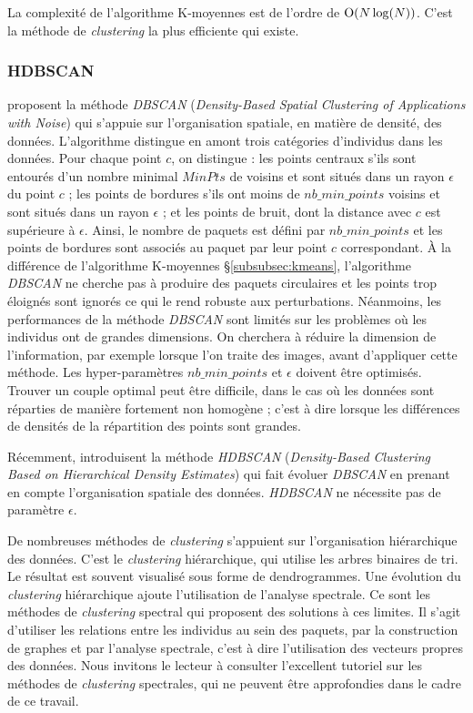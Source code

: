La complexité de l'algorithme K-moyennes est de l'ordre de  $\operatorname{O}(N \log(N))$.
C'est la méthode de \textit{clustering} la plus efficiente qui existe.

\subsubsection{HDBSCAN} \label{subsubsec:hdbscan}
\citeauthor{ester_densitybased_1996} \cite{ester_densitybased_1996} proposent la méthode \textit{DBSCAN} (\textit{Density-Based Spatial Clustering of Applications with Noise}) qui s'appuie sur l'organisation spatiale, en matière de densité, des données.
L'algorithme distingue en amont trois catégories d'individus dans les données.
Pour chaque point $c$, on distingue : les points centraux s'ils sont entourés d'un nombre minimal $MinPts$ de voisins et sont situés dans un rayon $\epsilon$ du point $c$ ; les points de bordures s'ils ont moins de $nb\_min\_points$ voisins et sont situés dans un rayon $\epsilon$ ; et les points de bruit, dont la distance avec $c$ est supérieure à $\epsilon$.
Ainsi, le nombre de paquets est défini par $nb\_min\_points$ et les points de bordures sont associés au paquet par leur point $c$ correspondant.
À la différence de l'algorithme K-moyennes §\ref{subsubsec:kmeans}, l'algorithme \textit{DBSCAN} ne cherche pas à produire des paquets circulaires et les points trop éloignés sont ignorés ce qui le rend robuste aux perturbations.
Néanmoins, les performances de la méthode \textit{DBSCAN} sont limités sur les problèmes où les individus ont de grandes dimensions. On cherchera à réduire la dimension de l'information, par exemple lorsque l'on traite des images, avant d'appliquer cette méthode.
Les hyper-paramètres $nb\_min\_points$ et $\epsilon$ doivent être optimisés. Trouver un couple optimal peut être difficile, dans le cas où les données sont réparties de manière fortement non homogène ; c'est à dire lorsque les différences de densités de la répartition des points sont grandes.

Récemment, \citeauthor{campello_densitybased_2013} \cite{campello_densitybased_2013} introduisent la méthode \textit{HDBSCAN} (\textit{Density-Based Clustering Based on Hierarchical Density Estimates}) qui fait évoluer \textit{DBSCAN} en prenant en compte l'organisation spatiale des données.
\textit{HDBSCAN} ne nécessite pas de paramètre $\epsilon$.

De nombreuses méthodes de \textit{clustering} s'appuient sur l'organisation hiérarchique des données.
C'est le \textit{clustering} hiérarchique, qui utilise les arbres binaires de tri.
Le résultat est souvent visualisé sous forme de dendrogrammes.
Une évolution du \textit{clustering} hiérarchique ajoute l'utilisation de l'analyse spectrale.
Ce sont les méthodes de \textit{clustering} spectral qui proposent des solutions à ces limites.
Il s'agit d'utiliser les relations entre les individus au sein des paquets, par la construction de graphes et par l'analyse spectrale, c'est à dire l'utilisation des vecteurs propres des données.
Nous invitons le lecteur à consulter l'excellent tutoriel  \cite{vonluxburg_tutorial_2007} sur les méthodes de \textit{clustering} spectrales, qui ne peuvent être approfondies dans le cadre de ce travail.

